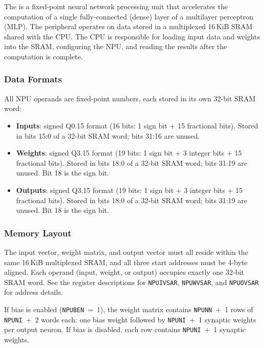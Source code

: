 The  is a fixed-point neural network processing unit that accelerates the computation of a single fully-connected (dense) layer of a multilayer perceptron (MLP). The peripheral operates on data stored in a multiplexed 16\,KiB SRAM shared with the CPU. The CPU is responsible for loading input data and weights into the SRAM, configuring the NPU, and reading the results after the computation is complete.

\subsubsection*{Data Formats}

All NPU operands are fixed-point numbers, each stored in its own 32-bit SRAM word:

\begin{itemize}
    \item \textbf{Inputs}: signed Q0.15 format (16 bits: 1 sign bit + 15 fractional bits). Stored in bits 15:0 of a 32-bit SRAM word; bits 31:16 are unused.
    \item \textbf{Weights}: signed Q3.15 format (19 bits: 1 sign bit + 3 integer bits + 15 fractional bits). Stored in bits 18:0 of a 32-bit SRAM word; bits 31:19 are unused. Bit 18 is the sign bit.
    \item \textbf{Outputs}: signed Q3.15 format (19 bits: 1 sign bit + 3 integer bits + 15 fractional bits). Stored in bits 18:0 of a 32-bit SRAM word; bits 31:19 are unused. Bit 18 is the sign bit.
\end{itemize}

\subsubsection*{Memory Layout}

The input vector, weight matrix, and output vector must all reside within the same 16\,KiB multiplexed SRAM, and all three start addresses must be 4-byte aligned. Each operand (input, weight, or output) occupies exactly one 32-bit SRAM word. See the register descriptions for \texttt{NPUIVSAR}, \texttt{NPUWVSAR}, and \texttt{NPUOVSAR} for address details.

If bias is enabled (\texttt{NPUBEN}~=~1), the weight matrix contains \texttt{NPUNN}~+~1 rows of \texttt{NPUNI}~+~2 words each: one bias weight followed by \texttt{NPUNI}~+~1 synaptic weights per output neuron. If bias is disabled, each row contains \texttt{NPUNI}~+~1 synaptic weights.

